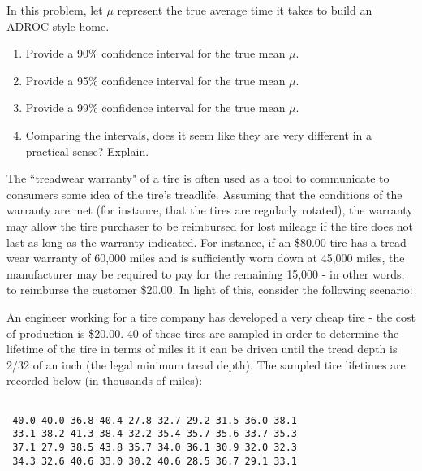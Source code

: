 \documentclass[11pt]{article}\usepackage[]{graphicx}\usepackage[]{color}
\makeatletter
\newenvironment{kframe}{%
 \def\at@end@of@kframe{}%
 \ifinner\ifhmode%
  \def\at@end@of@kframe{\end{minipage}}%
  \begin{minipage}{\columnwidth}%
 \fi\fi%
 \def\FrameCommand##1{\hskip\@totalleftmargin \hskip-\fboxsep
 \colorbox{shadecolor}{##1}\hskip-\fboxsep
     \hskip-\linewidth \hskip-\@totalleftmargin \hskip\columnwidth}%
 \MakeFramed {\advance\hsize-\width
   \@totalleftmargin\z@ \linewidth\hsize
   \@setminipage}}%
 {\par\unskip\endMakeFramed%
 \at@end@of@kframe}
\newenvironment{knitrout}{}{} %
\makeatother
\begin{document}
In this problem, let $\mu$ represent the true average time it takes to build an ADROC style home.

\begin{enumerate}

   \item Provide a 90\% confidence interval for the true mean $\mu$.

   \item Provide a 95\% confidence interval for the true mean $\mu$.

   \item Provide a 99\% confidence interval for the true mean $\mu$.

   \item Comparing the intervals, does it seem like they are very different in a practical sense? Explain.

\end{enumerate}


\item 
   The ``treadwear warranty" of a tire is often used as a tool to communicate to consumers some idea of the tire's treadlife. 
   Assuming that the conditions of the warranty are met (for instance, that the tires are regularly rotated),
   the warranty may allow the tire purchaser to be reimbursed for lost mileage if the tire does not last as long as the warranty indicated.
   For instance, if an \$80.00 tire has a tread wear warranty of 60,000 miles and is sufficiently worn down at 45,000 miles, the manufacturer may be required to pay for the remaining 15,000 - in other words, to reimburse the customer \$20.00.
   In light of this, consider the following scenario:

   An engineer working for a tire company has developed a very cheap tire - the cost of production is \$20.00.
   40 of these tires are sampled in order to determine the lifetime of the tire in terms of miles it it can be driven until the tread depth is 2/32 of an inch (the legal minimum tread depth).
   The sampled tire lifetimes are recorded below (in thousands of miles):

\begin{knitrout}
\color{fgcolor}\begin{kframe}
\begin{verbatim}
                                                  
 40.0 40.0 36.8 40.4 27.8 32.7 29.2 31.5 36.0 38.1
 33.1 38.2 41.3 38.4 32.2 35.4 35.7 35.6 33.7 35.3
 37.1 27.9 38.5 43.8 35.7 34.0 36.1 30.9 32.0 32.3
 34.3 32.6 40.6 33.0 30.2 40.6 28.5 36.7 29.1 33.1
\end{verbatim}
\end{kframe}
\end{knitrout}
   
\end{document}
